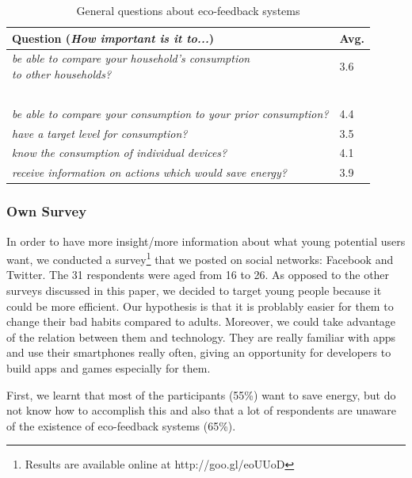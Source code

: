 \documentclass[journal]{vgtc}                %
\begin{document}
\begin{table}
  \caption{General questions about eco-feedback systems  \cite{karjalainen2011consumer}}
  \label{prototypesquestions}
  \scriptsize
  \begin{center}
    \begin{tabular}{|ll|}
    \hline
       Question (\textit{How important is it to...}) & Avg. \\ \hline
       \pbox{20cm}{\textit{be able to compare your household's consumption}\\\textit{to other households?}} & 3.6 \\ ~\\[-0.25cm]
       \textit{be able to compare your consumption to your prior consumption?} & 4.4 \\ 
       \textit{have a target level for consumption?} & 3.5 \\ 
       \textit{know the consumption of individual devices?} & 4.1 \\ 
       \textit{receive information on actions which would save energy?} & 3.9 \\
       \hline
    \end{tabular}
  \end{center}
\end{table}

\subsubsection{Own Survey}

In order to have more insight/more information about what young potential users want, we conducted a survey\footnote{Results are available online at {http://goo.gl/eoUUoD}} that we posted on social networks: Facebook and Twitter.
The 31 respondents were aged from 16 to 26. %
As opposed to the other surveys discussed in this paper, we decided to target young people because it could be more efficient. Our hypothesis is that it is problably easier for them to change their bad habits compared to adults. Moreover, we could take advantage of the relation between them and technology. They are really familiar with apps and use their smartphones really often, giving an opportunity for developers to build apps and games especially for them.

First, we learnt that most of the participants (55\%) want to save energy, but do not know how to accomplish this and also that a lot of respondents are unaware of the existence of eco-feedback systems (65\%).
 
\end{document}
